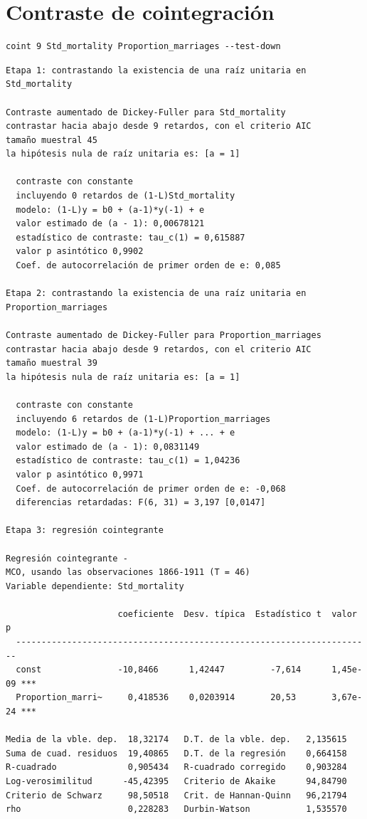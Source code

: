 \documentclass[10pt]{article}
\begin{document}
\section*{Contraste de cointegración}
\label{sec:org6ae8cb0}

\begin{verbatim}
coint 9 Std_mortality Proportion_marriages --test-down
\end{verbatim}

\begin{verbatim}
Etapa 1: contrastando la existencia de una raíz unitaria en Std_mortality

Contraste aumentado de Dickey-Fuller para Std_mortality
contrastar hacia abajo desde 9 retardos, con el criterio AIC
tamaño muestral 45
la hipótesis nula de raíz unitaria es: [a = 1]

  contraste con constante 
  incluyendo 0 retardos de (1-L)Std_mortality
  modelo: (1-L)y = b0 + (a-1)*y(-1) + e
  valor estimado de (a - 1): 0,00678121
  estadístico de contraste: tau_c(1) = 0,615887
  valor p asintótico 0,9902
  Coef. de autocorrelación de primer orden de e: 0,085

Etapa 2: contrastando la existencia de una raíz unitaria en Proportion_marriages

Contraste aumentado de Dickey-Fuller para Proportion_marriages
contrastar hacia abajo desde 9 retardos, con el criterio AIC
tamaño muestral 39
la hipótesis nula de raíz unitaria es: [a = 1]

  contraste con constante 
  incluyendo 6 retardos de (1-L)Proportion_marriages
  modelo: (1-L)y = b0 + (a-1)*y(-1) + ... + e
  valor estimado de (a - 1): 0,0831149
  estadístico de contraste: tau_c(1) = 1,04236
  valor p asintótico 0,9971
  Coef. de autocorrelación de primer orden de e: -0,068
  diferencias retardadas: F(6, 31) = 3,197 [0,0147]

Etapa 3: regresión cointegrante

Regresión cointegrante - 
MCO, usando las observaciones 1866-1911 (T = 46)
Variable dependiente: Std_mortality

                      coeficiente  Desv. típica  Estadístico t  valor p 
  ----------------------------------------------------------------------
  const               -10,8466      1,42447         -7,614      1,45e-09 ***
  Proportion_marri~     0,418536    0,0203914       20,53       3,67e-24 ***

Media de la vble. dep.  18,32174   D.T. de la vble. dep.   2,135615
Suma de cuad. residuos  19,40865   D.T. de la regresión    0,664158
R-cuadrado              0,905434   R-cuadrado corregido    0,903284
Log-verosimilitud      -45,42395   Criterio de Akaike      94,84790
Criterio de Schwarz     98,50518   Crit. de Hannan-Quinn   96,21794
rho                     0,228283   Durbin-Watson           1,535570


\end{verbatim}
\end{document}
